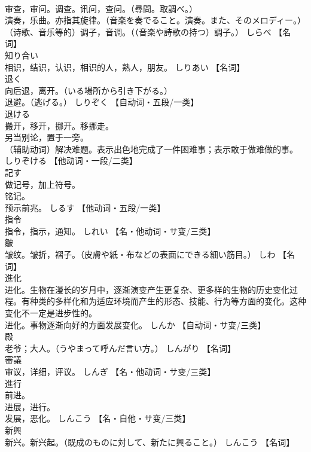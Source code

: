 \documentclass[8pt]{extreport}
\begin{document}
\begin{CJK}{UTF8}{min}
\\	审查，审问。调查。讯问，查问。（尋問。取調べ。） 
\\	演奏，乐曲。亦指其旋律。（音楽を奏でること。演奏。また、そのメロディー。） 
\\	（诗歌、音乐等的）调子，音调。（（音楽や詩歌の持つ）調子。）	しらべ		【名词】
\\	知り合い	
\\	相识，结识，认识，相识的人，熟人，朋友。	しりあい		【名词】
\\	退く	
\\	向后退，离开。（いる場所から引き下がる。） 
\\	退避。（逃げる。）	しりぞく		【自动词・五段/一类】
\\	退ける	
\\	搬开，移开，挪开。移挪走。 
\\	另当别论，置于一旁。 
\\	（辅助动词）解决难题。表示出色地完成了一件困难事；表示敢于做难做的事。	しりぞける		【他动词・一段/二类】
\\	記す	
\\	做记号，加上符号。 
\\	铭记。 
\\	预示前兆。	しるす		【他动词・五段/一类】
\\	指令	
\\	指令，指示，通知。	しれい		【名・他动词・サ变/三类】
\\	皺	
\\	皱纹。皱折，褶子。（皮膚や紙・布などの表面にできる細い筋目。）	しわ		【名词】
\\	進化	
\\	进化。生物在漫长的岁月中，逐渐演变产生更复杂、更多样的生物的历史变化过程。有种类的多样化和为适应环境而产生的形态、技能、行为等方面的变化。这种变化不一定是进步性的。 
\\	进化。事物逐渐向好的方面发展变化。	しんか		【自动词・サ变/三类】
\\	殿	
\\	老爷；大人。（うやまって呼んだ言い方。）	しんがり		【名词】
\\	審議	
\\	审议，详细，评议。	しんぎ		【名・他动词・サ变/三类】
\\	進行	
\\	前进。 
\\	进展，进行。 
\\	发展，恶化。	しんこう		【名・自他・サ变/三类】
\\	新興	
\\	新兴。新兴起。（既成のものに対して、新たに興ること。）	しんこう		【名词】

\end{CJK}
\end{document}
